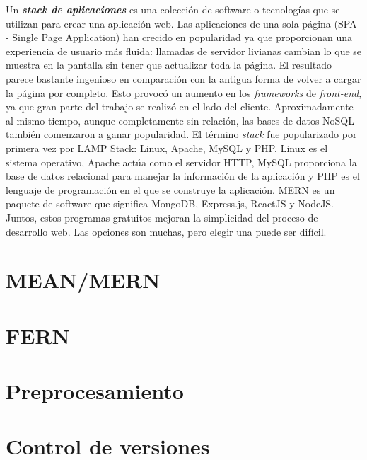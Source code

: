 \thispagestyle{fancy}
Un \textbf{\textit{stack de aplicaciones}} es una colección de software o tecnologías que se utilizan para crear una aplicación web. Las aplicaciones de una sola página (SPA - Single Page Application) han crecido en popularidad ya que proporcionan una experiencia de usuario más fluida: llamadas de servidor livianas cambian lo que se muestra en la pantalla sin tener que actualizar toda la página. El resultado parece bastante ingenioso en comparación con la antigua forma de volver a cargar la página por completo. Esto provocó un aumento en los \textit{frameworks} de \textit{front-end}, ya que gran parte del trabajo se realizó en el lado del cliente. Aproximadamente al mismo tiempo, aunque completamente sin relación, las bases de datos NoSQL también comenzaron a ganar popularidad. El término \textit{stack} fue popularizado por primera vez por LAMP Stack: Linux, Apache, MySQL y PHP. Linux es el sistema operativo, Apache actúa como el servidor HTTP, MySQL proporciona la base de datos relacional para manejar la información de la aplicación y PHP es el lenguaje de programación en el que se construye la aplicación. MERN es un paquete de software que significa MongoDB, Express.js, ReactJS y NodeJS. Juntos, estos programas gratuitos mejoran la simplicidad del proceso de desarrollo web. Las opciones son muchas, pero elegir una puede ser difícil.

% 

\section{MEAN/MERN}


\newpage
\section{FERN}


\newpage
\section{Preprocesamiento}


\newpage
\section{Control de versiones}
